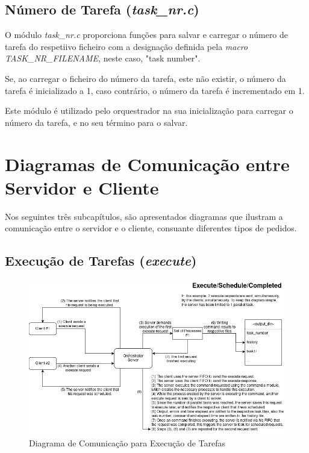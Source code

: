 \documentclass[a4paper,11pt]{scrreprt}
\begin{document}
        \subsection{Número de Tarefa (\textit{task\_nr.c})}
            O módulo \textit{task\_nr.c} proporciona funções para salvar e carregar o número
            de tarefa do respetiivo ficheiro com a designação definida pela
            \textit{macro TASK\_NR\_FILENAME}, neste caso, "task number".

            Se, ao carregar o ficheiro do número da tarefa, este não existir,
            o número da tarefa é inicializado a 1,
            caso contrário, o número da tarefa é incrementado em 1.

            Este módulo é utilizado pelo orquestrador na sua inicialização para carregar o
            número da tarefa, e no seu término para o salvar.

    \clearpage
    \section{Diagramas de Comunicação entre Servidor e Cliente}
        \label{sec:1.3}
        Nos seguintes três subcapítulos, são apresentados diagramas que ilustram a comunicação
        entre o servidor e o cliente, consuante diferentes tipos de pedidos.
        \subsection{Execução de Tarefas (\textit{execute})}
                \begin{figure}[!ht]
                    \centering
                    \includegraphics[width=\textwidth]{diagrams/execute.png}
                    \caption{Diagrama de Comunicação para Execução de Tarefas}
                    \label{fig:1.2}
                \end{figure}
\end{document}
